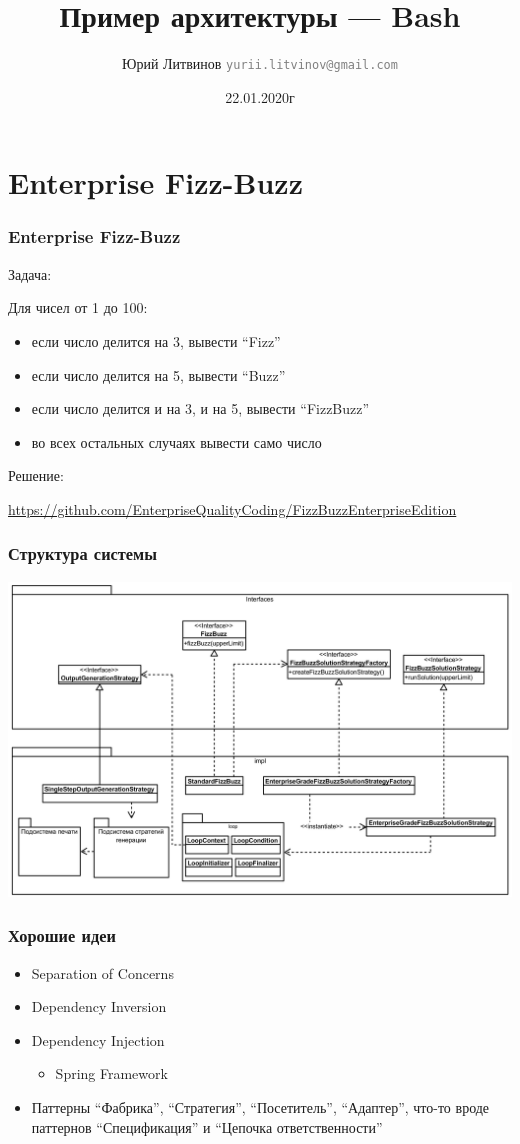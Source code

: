 \documentclass[xetex,mathserif,serif]{beamer}
\title{Пример архитектуры --- Bash}
\author[Юрий Литвинов]{Юрий Литвинов \newline \textcolor{gray}{\small\texttt{yurii.litvinov@gmail.com}}}
\date{22.01.2020г}
\begin{document}
	
	\frame{\titlepage}

	\section{Enterprise Fizz-Buzz}

	\begin{frame}
		\frametitle{Enterprise Fizz-Buzz}
		Задача:

		Для чисел от 1 до 100:
		\begin{itemize}
			\item если число делится на 3, вывести ``Fizz''
			\item если число делится на 5, вывести ``Buzz''
			\item если число делится и на 3, и на 5, вывести ``FizzBuzz''
			\item во всех остальных случаях вывести само число
		\end{itemize}

		Решение:

		\url{https://github.com/EnterpriseQualityCoding/FizzBuzzEnterpriseEdition}
	\end{frame}

	\begin{frame}
		\frametitle{Структура системы}
		\begin{center}
			\includegraphics[width=\textwidth]{fizzBuzzArchitecture.png}
		\end{center}
	\end{frame}

	\begin{frame}
		\frametitle{Хорошие идеи}
		\begin{itemize}
			\item Separation of Concerns
			\item Dependency Inversion
			\item Dependency Injection
			\begin{itemize}
				\item Spring Framework
			\end{itemize}
			\item Паттерны ``Фабрика'', ``Стратегия'', ``Посетитель'', ``Адаптер'', что-то вроде паттернов ``Спецификация'' и ``Цепочка ответственности''
		\end{itemize}
	\end{frame}
\end{document}
